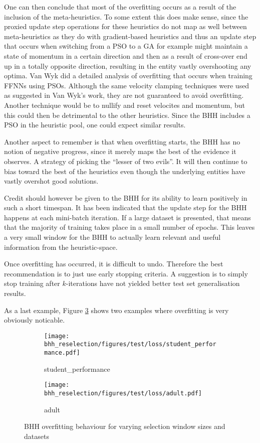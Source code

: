 One can then conclude that most of the overfitting occurs as a result of the inclusion of the meta-heuristics. To some extent this does make sense, since the proxied update step operations for these heuristics do not map as well between meta-heuristics as they do with gradient-based heuristics and thus an update step that occurs when switching from a \acs{PSO} to a \acs{GA} for example might maintain a state of momentum in a certain direction and then as a result of cross-over end up in a totally opposite direction, resulting in the entity vastly overshooting any optima. Van Wyk \cite{ref:vanwyk:2014} did a detailed analysis of overfitting that occurs when training \acp{FFNN} using \acp{PSO}. Although the same velocity clamping techniques were used as suggested in Van Wyk's work, they are not guaranteed to avoid overfitting. Another technique would be to nullify and reset velocites and momentum, but this could then be detrimental to the other heuristics. Since the \Ac{BHH} includes a \acs{PSO} in the heuristic pool, one could expect similar results.

Another aspect to remember is that when overfitting starts, the \Ac{BHH} has no notion of negative progress, since it merely maps the best of the evidence it observes. A strategy of picking the ``lesser of two evils''. It will then continue to bias toward the best of the heuristics even though the underlying entities have vastly overshot good solutions.

Credit should however be given to the \Ac{BHH} for its ability to learn positively in such a short timespan. It has been indicated that the update step for the \Ac{BHH} happens at each mini-batch iteration. If a large dataset is presented, that means that the majority of training takes place in a small number of epochs. This leaves a very small window for the \Ac{BHH} to actually learn relevant and useful information from the heuristic-space.

Once overfitting has occurred, it is difficult to undo. Therefore the best recommendation is to just use early stopping criteria. A suggestion is to simply stop training after $k$-iterations have not yielded better test set generalisation results.

As a last example, Figure \ref{fig:results:overfitting:figures:loss} shows two examples where overfitting is very obviously noticable.

\begin{figure}[htbp]
	\begin{subfigure}{0.5\textwidth}
		\centering
		\texttt{[image: bhh\_reselection/figures/test/loss/student\_performance.pdf]}
		\caption{student\_performance}
		\label{fig:results:overfitting:figures:loss1}
	\end{subfigure}
	\begin{subfigure}{0.5\textwidth}
		\centering
		\texttt{[image: bhh\_reselection/figures/test/loss/adult.pdf]}
		\caption{adult}
		\label{fig:results:overfitting:figures:loss2}
	\end{subfigure}
	\caption{\Acs{BHH} overfitting behaviour for varying selection window sizes and datasets}
	\label{fig:results:overfitting:figures:loss}
\end{figure}

